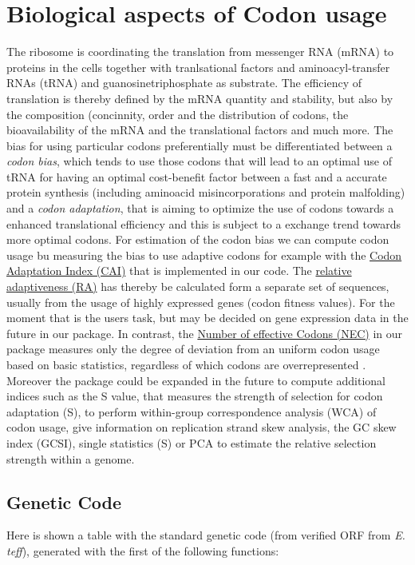 \section{Biological aspects of Codon usage}
The ribosome is coordinating the translation from messenger RNA (mRNA) to proteins in the cells together with tranlsational factors and aminoacyl-transfer RNAs (tRNA) and guanosinetriphosphate as substrate. The efficiency of translation is thereby defined by the mRNA quantity and stability, but also by the composition (concinnity, order and the distribution of codons, the bioavailability of the mRNA and the translational factors and much more. The bias for using particular codons preferentially must be differentiated between a \textit{codon bias}, which tends to use those codons that will lead to an optimal use of tRNA for having an optimal cost-benefit factor between a fast and a accurate protein synthesis (including aminoacid misincorporations and protein malfolding) and a \textit{codon adaptation}, that is aiming to optimize the use of codons towards a enhanced translational efficiency and this is subject to a exchange trend towards more optimal codons.
For estimation of the codon bias we can compute codon usage bu measuring the bias to use adaptive codons for example with the \hyperlink{function:CAI}{Codon Adaptation Index (CAI)} that is implemented in our code. The \hyperlink{function:RA}{relative adaptiveness (RA)} has thereby be calculated form a separate set of sequences, usually from the usage of highly expressed genes (codon fitness values). For the moment that is the users task, but may be decided on gene expression data in the future in our package. In contrast, the \hyperlink{function:NEC}{Number of effective Codons (NEC)} in our package measures only the degree of deviation from an uniform codon usage based on basic statistics, regardless of which codons are overrepresented \cite{Suzuki2016}.
Moreover the package could be expanded in the future to compute additional indices such as the S value, that measures the strength of selection for codon adaptation (S), to perform within-group correspondence analysis (WCA) of codon usage, give information on replication strand skew analysis, the GC skew index (GCSI), single statistics (S) or PCA to estimate the relative selection strength within a genome.

\subsection{Genetic Code}
Here is shown a table with the standard genetic code (from verified ORF from \textit{E. teff}), generated with the first of the following functions:  
  
  

